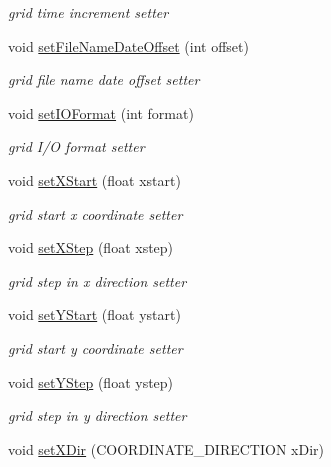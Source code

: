 \begin{DoxyCompactItemize}
\begin{DoxyCompactList}\small\item\em grid time increment setter \end{DoxyCompactList}\item 
void \hyperlink{classfwi_1_1grid_1_1Grid_a15e1fd1e87919bba2971a6fe66566f43}{set\-File\-Name\-Date\-Offset} (int offset)
\begin{DoxyCompactList}\small\item\em grid file name date offset setter \end{DoxyCompactList}\item 
void \hyperlink{classfwi_1_1grid_1_1Grid_a4fe86c25ec42f48f70d2353721e9aeed}{set\-I\-O\-Format} (int format)
\begin{DoxyCompactList}\small\item\em grid I/\-O format setter \end{DoxyCompactList}\item 
void \hyperlink{classfwi_1_1grid_1_1Grid_a3e358d51e63374a9174fcff2206ba9d1}{set\-X\-Start} (float xstart)
\begin{DoxyCompactList}\small\item\em grid start x coordinate setter \end{DoxyCompactList}\item 
void \hyperlink{classfwi_1_1grid_1_1Grid_a442147db5a15cb302bc640041bc42d49}{set\-X\-Step} (float xstep)
\begin{DoxyCompactList}\small\item\em grid step in x direction setter \end{DoxyCompactList}\item 
void \hyperlink{classfwi_1_1grid_1_1Grid_a9a22e6a8991396d957900b33b9db6558}{set\-Y\-Start} (float ystart)
\begin{DoxyCompactList}\small\item\em grid start y coordinate setter \end{DoxyCompactList}\item 
void \hyperlink{classfwi_1_1grid_1_1Grid_aeb84b8b6061243f47f6cea19bda8acbc}{set\-Y\-Step} (float ystep)
\begin{DoxyCompactList}\small\item\em grid step in y direction setter \end{DoxyCompactList}\item 
void \hyperlink{classfwi_1_1grid_1_1Grid_a58a313c74d268e1a892877dbe97782e0}{set\-X\-Dir} (C\-O\-O\-R\-D\-I\-N\-A\-T\-E\-\_\-\-D\-I\-R\-E\-C\-T\-I\-O\-N x\-Dir)

\end{DoxyCompactItemize}
